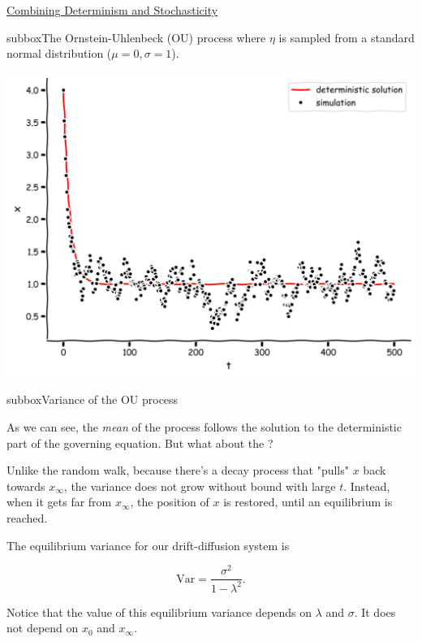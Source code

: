 \begin{textbox}{\href{https://compneuro.neuromatch.io/tutorials/W2D2_LinearSystems/student/W2D2_Tutorial3.html}{Combining Determinism and Stochasticity } }
\begin{subbox}{subbox}{The Ornstein-Uhlenbeck (OU) process}
where $\eta$ is sampled from a standard normal distribution ($\mu=0, \sigma=1$). 
\begin{center}
\includegraphics[scale=0.08]{Figures/LS/CDS_Figure7.png}
\end{center}
\end{subbox}
\begin{subbox}{subbox}{Variance of the OU process}
\scriptsize

As we can see, the \textit{mean} of the process follows the solution to the deterministic part of the governing equation. But what about the ? 

Unlike the random walk, because there's a decay process that "pulls" $x$ back towards $x_\infty$, the variance does not grow without bound with large $t$. Instead, when it gets far from $x_\infty$, the position of $x$ is restored, until an equilibrium is reached.

The equilibrium variance for our drift-diffusion system is

\[\text{Var} = \frac{\sigma^2}{1 - \lambda^2}.\]

Notice that the value of this equilibrium variance depends on $\lambda$ and $\sigma$. It does not depend on $x_0$ and $x_\infty$.

\end{subbox}

\end{textbox}

